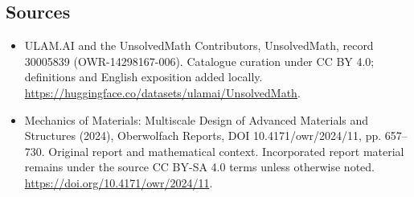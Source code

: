 \documentclass[11pt]{article}
\begin{document}
\subsection{Sources}
\begin{itemize}
\item[\hypertarget{source:30005839:1}{S1}] ULAM.AI and the UnsolvedMath Contributors, UnsolvedMath, record 30005839 (OWR-14298167-006). Catalogue curation under CC BY 4.0; definitions and English exposition added locally.
\url{https://huggingface.co/datasets/ulamai/UnsolvedMath}.
\item[\hypertarget{source:30005839:2}{S2}] Mechanics of Materials: Multiscale Design of Advanced Materials and Structures (2024), Oberwolfach Reports, DOI 10.4171/owr/2024/11, pp. 657--730. Original report and mathematical context. Incorporated report material remains under the source CC BY-SA 4.0 terms unless otherwise noted.
\url{https://doi.org/10.4171/owr/2024/11}.
\end{itemize}
\label{end:30005839}
\end{document}
